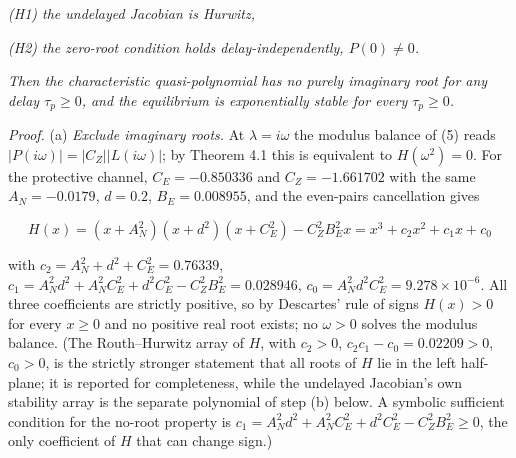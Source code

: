 \documentclass[11pt]{article}
\begin{document}
\emph{(H1) the undelayed Jacobian is Hurwitz,}

\emph{(H2) the zero-root condition holds delay-independently,
\(P(0) \ne 0\).}

\emph{Then the characteristic quasi-polynomial has no purely imaginary
root for any delay \(\tau_p \ge 0\), and the equilibrium is
exponentially stable for every \(\tau_p \ge 0\).}

\emph{Proof.} (a) \emph{Exclude imaginary roots.} At
\(\lambda = i\omega\) the modulus balance of (5) reads
\(|P(i\omega)| = |C_Z||L(i\omega)|\); by Theorem 4.1 this is equivalent
to \(H(\omega^2) = 0\). For the protective channel, \(C_E = -0.850336\)
and \(C_Z = -1.661702\) with the same \(A_N = -0.0179\), \(d = 0.2\),
\(B_E = 0.008955\), and the even-pairs cancellation gives

\[H(x) = (x + A_N^2)(x + d^2)(x + C_E^2) - C_Z^2 B_E^2 x = x^3 + c_2 x^2 + c_1 x + c_0\]

with \(c_2 = A_N^2 + d^2 + C_E^2 = 0.76339\),
\(c_1 = A_N^2 d^2 + A_N^2 C_E^2 + d^2 C_E^2 - C_Z^2 B_E^2 = 0.028946\),
\(c_0 = A_N^2 d^2 C_E^2 = 9.278\times10^{-6}\). All three coefficients
are strictly positive, so by Descartes' rule of signs \(H(x) > 0\) for
every \(x \ge 0\) and no positive real root exists; no \(\omega > 0\)
solves the modulus balance. (The Routh--Hurwitz array of \(H\), with
\(c_2 > 0\), \(c_2 c_1 - c_0 = 0.02209 > 0\), \(c_0 > 0\), is the
strictly stronger statement that all roots of \(H\) lie in the left
half-plane; it is reported for completeness, while the undelayed
Jacobian's own stability array is the separate polynomial of step (b)
below. A symbolic sufficient condition for the no-root property is
\(c_1 = A_N^2 d^2 + A_N^2 C_E^2 + d^2 C_E^2 - C_Z^2 B_E^2 \ge 0\), the
only coefficient of \(H\) that can change sign.)
\end{document}
